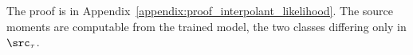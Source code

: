 The proof is in Appendix~\ref{appendix:proof_interpolant_likelihood}. The source moments are computable from the trained model, the two classes differing only in $\src_\tau$.






